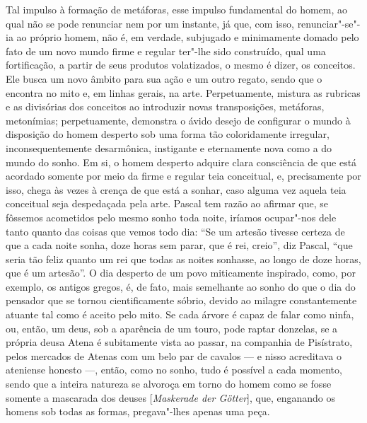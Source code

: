 Tal impulso à formação de metáforas, esse impulso fundamental do homem,
ao qual não se pode renunciar nem por um instante, já que, com isso,
renunciar"-se"-ia ao próprio homem, não é, em verdade, subjugado e
minimamente domado pelo fato de um novo mundo firme e regular ter"-lhe
sido construído, qual uma fortificação, a partir de seus produtos
volatizados, o mesmo é dizer, os conceitos. Ele busca um novo âmbito
para sua ação e um outro regato, sendo que o encontra no mito e, em
linhas gerais, na arte. Perpetuamente, mistura as rubricas e as
divisórias dos conceitos ao introduzir novas transposições, metáforas,
metonímias; perpetuamente, demonstra o ávido desejo de configurar
o mundo à disposição do homem desperto sob uma forma tão coloridamente
irregular, inconsequentemente desarmônica, instigante e eternamente
nova como a do mundo do sonho. Em si, o homem desperto adquire clara
consciência de que está acordado somente por meio da firme e regular
teia conceitual, e, precisamente por isso, chega às vezes à crença de
que está a sonhar, caso alguma vez aquela teia conceitual seja despedaçada
pela arte. Pascal tem razão ao afirmar que, 
se fôssemos acometidos pelo mesmo sonho toda noite, iríamos ocupar"-nos dele tanto
quanto das coisas que vemos todo dia: “Se um artesão tivesse certeza de
que a cada noite sonha, doze horas sem parar, que é rei, creio”, diz
Pascal, “que seria tão feliz quanto um rei que todas as noites sonhasse,
ao longo de doze horas, que é um artesão”. O dia desperto de um povo
miticamente inspirado, como, por exemplo, os antigos gregos, é, de
fato, mais semelhante ao sonho do que o dia do pensador que se tornou
cientificamente sóbrio, devido ao milagre constantemente atuante tal
como é aceito pelo mito. Se cada árvore é capaz de falar como ninfa,
ou, então, um deus, sob a aparência de um touro, pode raptar donzelas,
se a própria deusa Atena é subitamente vista ao passar, na companhia de
Pisístrato, pelos mercados de Atenas com um belo par de cavalos --- e
nisso acreditava o ateniense honesto ---, então, como no sonho, tudo é
possível a cada momento, sendo que a inteira natureza se alvoroça em
torno do homem como se fosse somente a mascarada dos deuses
[\textit{Maskerade der Götter}], que, enganando os homens sob todas as
formas, pregava"-lhes apenas uma peça.

